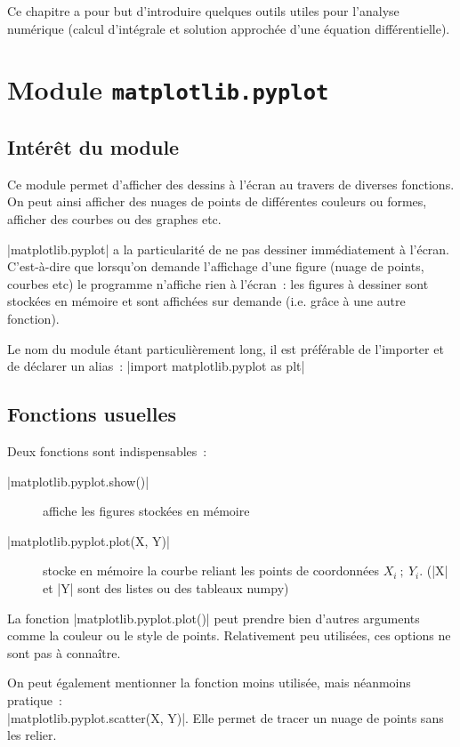 Ce chapitre a pour but d'introduire quelques outils utiles pour l'analyse numérique (calcul d'intégrale et solution approchée d'une équation différentielle).

\section{Module \texttt{matplotlib.pyplot}}
	
	\subsection{Intérêt du module}

		Ce module permet d'afficher des dessins à l'écran au travers de diverses fonctions. On peut ainsi afficher des nuages de points de différentes couleurs ou formes, afficher des courbes ou des graphes etc.
	
		\python|matplotlib.pyplot| a la particularité de ne pas dessiner immédiatement à l'écran.
		C'est-à-dire que lorsqu'on demande l'affichage d'une figure (nuage de points, courbes etc) le programme n'affiche rien à l'écran~: les figures à dessiner sont stockées en mémoire et sont affichées sur demande (i.e. grâce à une autre fonction).
		
		Le nom du module étant particulièrement long, il est préférable de l'importer et de déclarer un alias~: \python|import matplotlib.pyplot as plt|
	
	\subsection{Fonctions usuelles}
		 
		 Deux fonctions sont indispensables~:
		 \begin{description}
		 	\item[\python|matplotlib.pyplot.show()|] affiche les figures stockées en mémoire
		 	\item[\python|matplotlib.pyplot.plot(X, Y)|] stocke en mémoire la courbe reliant les points de coordonnées $X_i~;\ Y_i$. (\python|X| et \python|Y| sont des listes ou des tableaux numpy)
		 \end{description}
		 
		 La fonction \python|matplotlib.pyplot.plot()| peut prendre bien d'autres arguments comme la couleur ou le style de points. Relativement peu utilisées, ces options ne sont pas à connaître.
		 
		 On peut également mentionner la fonction moins utilisée, mais néanmoins pratique~:\\\python|matplotlib.pyplot.scatter(X, Y)|. Elle permet de tracer un nuage de points sans les relier.
	
